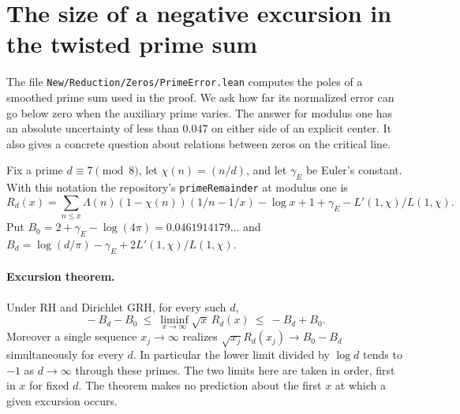\section{The size of a negative excursion in the twisted prime sum}
\label{sec:osc}
The file \texttt{New/Reduction/Zeros/PrimeError.lean} computes
the poles of a smoothed prime sum used in the proof. We ask how far
its normalized error can go below zero when the auxiliary prime varies.
The answer for modulus one has an absolute uncertainty of less than
$0.047$ on either side of an explicit center. It also gives a concrete
question about relations between zeros on the critical line.

Fix a prime $d\equiv7\pmod 8$, let $\chi(n)=(n/d)$, and let
$\gamma_E$ be Euler's constant. With this notation the repository's
\texttt{primeRemainder} at modulus one is
\[
 R_d(x)=\sum_{n\le x}\Lambda(n)(1-\chi(n))(1/n-1/x)
       -\log x+1+\gamma_E-L'(1,\chi)/L(1,\chi).
\]
Put $B_0=2+\gamma_E-\log(4\pi)=0.0461914179\ldots$ and
$B_d=\log(d/\pi)-\gamma_E+2 L'(1,\chi)/L(1,\chi)$.

\paragraph{Excursion theorem.}
Under RH and Dirichlet GRH, for every such $d$,
\[
 \boxed{\quad -B_d-B_0\ \le\ \liminf_{x\to\infty}\sqrt x\,R_d(x)
                   \ \le\ -B_d+B_0.\quad}
\]
Moreover a single sequence $x_j\to\infty$ realizes
$\sqrt{x_j}R_d(x_j)\to B_0-B_d$ simultaneously for every $d$.
In particular the lower limit divided by $\log d$ tends to $-1$ as
$d\to\infty$ through these primes. The two limits here are taken in order,
first in $x$ for fixed $d$. The theorem makes no prediction about the
first $x$ at which a given excursion occurs.

